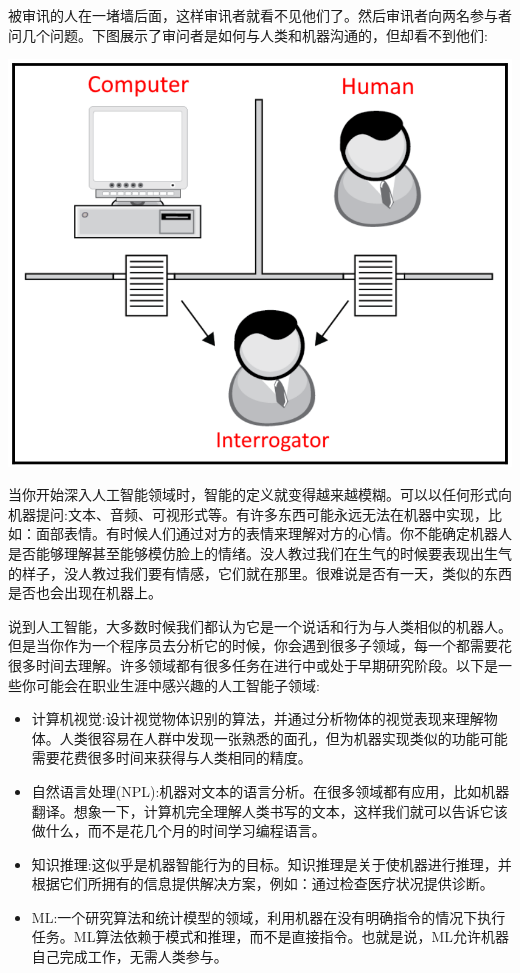 被审讯的人在一堵墙后面，这样审讯者就看不见他们了。然后审讯者向两名参与者问几个问题。下图展示了审问者是如何与人类和机器沟通的，但却看不到他们: \par

\begin{center}
	\includegraphics[width=1.0\textwidth]{content/Section-3/Chapter-15/1}
\end{center}

当你开始深入人工智能领域时，智能的定义就变得越来越模糊。可以以任何形式向机器提问:文本、音频、可视形式等。有许多东西可能永远无法在机器中实现，比如：面部表情。有时候人们通过对方的表情来理解对方的心情。你不能确定机器人是否能够理解甚至能够模仿脸上的情绪。没人教过我们在生气的时候要表现出生气的样子，没人教过我们要有情感，它们就在那里。很难说是否有一天，类似的东西是否也会出现在机器上。 \par
说到人工智能，大多数时候我们都认为它是一个说话和行为与人类相似的机器人。但是当你作为一个程序员去分析它的时候，你会遇到很多子领域，每一个都需要花很多时间去理解。许多领域都有很多任务在进行中或处于早期研究阶段。以下是一些你可能会在职业生涯中感兴趣的人工智能子领域: \par

\begin{itemize}
	\item 计算机视觉:设计视觉物体识别的算法，并通过分析物体的视觉表现来理解物体。人类很容易在人群中发现一张熟悉的面孔，但为机器实现类似的功能可能需要花费很多时间来获得与人类相同的精度。
	\item 自然语言处理(NPL):机器对文本的语言分析。在很多领域都有应用，比如机器翻译。想象一下，计算机完全理解人类书写的文本，这样我们就可以告诉它该做什么，而不是花几个月的时间学习编程语言。
	\item 知识推理:这似乎是机器智能行为的目标。知识推理是关于使机器进行推理，并根据它们所拥有的信息提供解决方案，例如：通过检查医疗状况提供诊断。
	\item ML:一个研究算法和统计模型的领域，利用机器在没有明确指令的情况下执行任务。ML算法依赖于模式和推理，而不是直接指令。也就是说，ML允许机器自己完成工作，无需人类参与。
\end{itemize}

